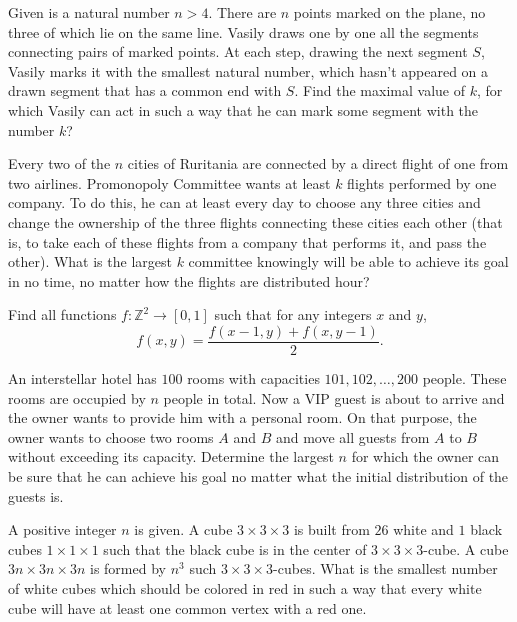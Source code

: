 \documentclass[11pt]{scrartcl}
\begin{document}
\begin{problem}[4218160072471349910]
Given is a natural number $n>4$. There are $n$ points marked on the plane, no three of which lie on the same line. Vasily draws one by one all the segments connecting pairs of marked points. At each step, drawing the next segment $S$, Vasily marks it with the smallest natural number, which hasn't appeared on a drawn segment that has a common end with $S$. Find the maximal value of $k$, for which Vasily can act in such a way that he can mark some segment with the number $k$?
\end{problem}
\begin{problem}[231259391294064]
Every two of the $n$ cities of Ruritania are connected by a direct flight of one from two airlines. Promonopoly Committee wants at least $k$ flights performed by one company. To do this, he can at least every day to choose any three cities and change the ownership of the three flights connecting these cities each other (that is, to take each of these flights from a company that performs it, and pass the other). What is the largest $k$ committee knowingly will be able to achieve its goal in no time, no matter how the flights are distributed hour?
\end{problem}
\begin{problem}[6360153743145135128]
Find all functions $f\colon \mathbb{Z}^2 \to [0, 1]$ such that for any integers $x$ and $y$,
\[f(x, y) = \frac{f(x - 1, y) + f(x, y - 1)}{2}.\]
\end{problem}
\begin{problem}[4429559846138102630]
An interstellar hotel has $100$ rooms with capacities $101,102,\ldots, 200$ people. These rooms are occupied by $n$ people in total. Now a VIP guest is about to arrive and the owner wants to provide him with a personal room. On that purpose, the owner wants to choose two rooms $A$ and $B$ and move all guests from $A$ to $B$ without exceeding its capacity. Determine the largest $n$ for which the owner can be sure that he can achieve his goal no matter what the initial distribution of the guests is.
\end{problem}
\begin{problem}[457934969594281]
	A positive integer $n$ is given. A cube $3\times3\times3$ is built from $26$ white and $1$ black cubes $1\times1\times1$ such that the black cube is in the center of $3\times3\times3$-cube. A cube $3n\times 3n\times 3n$ is formed by $n^3$ such $3\times3\times3$-cubes. What is the smallest number of white cubes which should be colored in red in such a way that every white cube will have at least one common vertex with a red one.
\end{problem}
\end{document}

